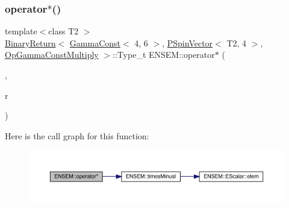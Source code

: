 \subsubsection{\texorpdfstring{operator$\ast$()}{operator*()}\hspace{0.1cm}{\footnotesize\ttfamily [7/32]}}
{\footnotesize\ttfamily template$<$class T2 $>$ \\
\mbox{\hyperlink{structENSEM_1_1BinaryReturn}{Binary\+Return}}$<$ \mbox{\hyperlink{classENSEM_1_1GammaConst}{Gamma\+Const}}$<$ 4, 6 $>$, \mbox{\hyperlink{classENSEM_1_1PSpinVector}{P\+Spin\+Vector}}$<$ T2, 4 $>$, \mbox{\hyperlink{structENSEM_1_1OpGammaConstMultiply}{Op\+Gamma\+Const\+Multiply}} $>$\+::Type\+\_\+t E\+N\+S\+E\+M\+::operator$\ast$ (\begin{DoxyParamCaption}\item[{const \mbox{\hyperlink{classENSEM_1_1GammaConst}{Gamma\+Const}}$<$ 4, 6 $>$ \&}]{,  }\item[{const \mbox{\hyperlink{classENSEM_1_1PSpinVector}{P\+Spin\+Vector}}$<$ T2, 4 $>$ \&}]{r }\end{DoxyParamCaption})\hspace{0.3cm}{\ttfamily [inline]}}

Here is the call graph for this function\+:\nopagebreak
\begin{figure}[H]
\begin{center}
\leavevmode
\includegraphics[width=350pt]{dd/d6d/group__primspinvector_gad9a09b9039ac73a95c0893a4bfd306c2_cgraph}
\end{center}
\end{figure}
\mbox{\label{group__primspinvector_ga155a168cc76a655423d76a2ad99776a1}} 
